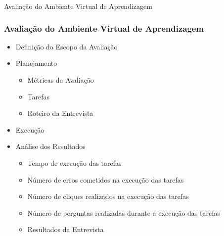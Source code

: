 \documentclass[aspectratio=169]{beamer}
\begin{document}
\begin{frame}{Avaliação do Ambiente Virtual de Aprendizagem}
\frametitle{Avaliação do Ambiente Virtual de Aprendizagem}

\begin{itemize}
	\item{Definição do Escopo da Avaliação}
	\pause
	\item{Planejamento}
		\begin{itemize}
			\item Métricas da Avaliação
			\pause
			\item Tarefas
			\pause
			\item Roteiro da Entrevista 
			\pause
		\end{itemize}
	\item Execução
	\pause
	\item Análise dos Resultados
		\begin{itemize}
			\item Tempo de execução das tarefas
			\pause
			\item Número de erros cometidos na execução das tarefas
			\pause
			\item Número de cliques realizados na execução das tarefas
			\pause
			\item Número de perguntas realizadas durante a execução das tarefas
			\pause
			\item Resultados da Entrevista
		\end{itemize}
\end{itemize}

\end{frame}
\end{document}
